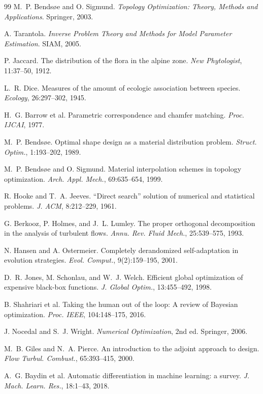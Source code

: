 \documentclass[11pt,a4paper]{article}
\begin{document}
\begin{thebibliography}{99}
 M.~P. Bends\o{}e and O. Sigmund. \textit{Topology
Optimization: Theory, Methods and Applications}. Springer, 2003.

 A. Tarantola. \textit{Inverse Problem Theory and Methods
for Model Parameter Estimation}. SIAM, 2005.

 P. Jaccard. The distribution of the flora in the alpine
zone. \textit{New Phytologist}, 11:37--50, 1912.

 L.~R. Dice. Measures of the amount of ecologic association
between species. \textit{Ecology}, 26:297--302, 1945.

 H.~G. Barrow et al. Parametric correspondence and chamfer
matching. \textit{Proc. IJCAI}, 1977.

 M.~P. Bends\o{}e. Optimal shape design as a material
distribution problem. \textit{Struct. Optim.}, 1:193--202, 1989.

 M.~P. Bends\o{}e and O. Sigmund. Material interpolation
schemes in topology optimization. \textit{Arch. Appl. Mech.}, 69:635--654, 1999.

 R. Hooke and T.~A. Jeeves. ``Direct search'' solution of
numerical and statistical problems. \textit{J. ACM}, 8:212--229, 1961.

 G. Berkooz, P. Holmes, and J.~L. Lumley. The proper
orthogonal decomposition in the analysis of turbulent flows. \textit{Annu. Rev.
Fluid Mech.}, 25:539--575, 1993.

 N. Hansen and A. Ostermeier. Completely derandomized
self-adaptation in evolution strategies. \textit{Evol. Comput.}, 9(2):159--195,
2001.

 D.~R. Jones, M. Schonlau, and W.~J. Welch. Efficient global
optimization of expensive black-box functions. \textit{J. Global Optim.},
13:455--492, 1998.

 B. Shahriari et al. Taking the human out of the loop: A
review of Bayesian optimization. \textit{Proc. IEEE}, 104:148--175, 2016.

 J. Nocedal and S.~J. Wright. \textit{Numerical
Optimization}, 2nd ed. Springer, 2006.

 M.~B. Giles and N.~A. Pierce. An introduction to the adjoint
approach to design. \textit{Flow Turbul. Combust.}, 65:393--415, 2000.

 A.~G. Baydin et al. Automatic differentiation in machine
learning: a survey. \textit{J. Mach. Learn. Res.}, 18:1--43, 2018.


\end{thebibliography}
\end{document}
